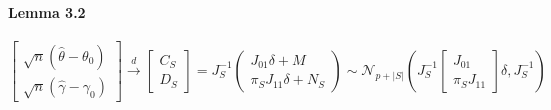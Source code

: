 \documentclass[12pt]{article}
\theoremstyle{definition}
\begin{document}
\paragraph{Lemma 3.2}
	$$
	\left[\begin{array}{c}
		\sqrt{n} (\hat{\theta} - \theta_0)\\
		\sqrt{n} (\hat{\gamma} - \gamma_0)
\end{array}\right]\overset{d}{\rightarrow} 
	\left[\begin{array}{c}
		C_S\\
		D_S
	\end{array}\right] = J_S^{-1}
	\left(\begin{array}{c}
		J_{01}\delta + M\\
		\pi_S J_{11}\delta + N_S 
	\end{array}\right) \sim \mathcal{N}_{p+|S|}
		\left(J_S^{-1}\left[\begin{array}{c}
			J_{01}\\
			\pi_S J_{11}
	\end{array}\right]\delta, J_S^{-1}\right)
$$
\end{document}
